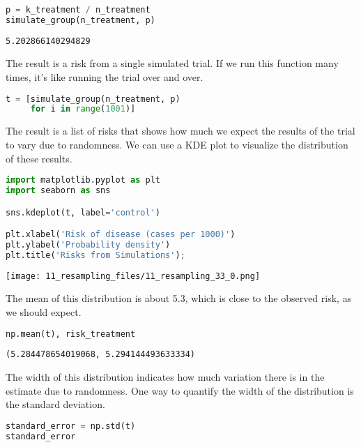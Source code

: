 \begin{lstlisting}[language=Python,style=source]
p = k_treatment / n_treatment
simulate_group(n_treatment, p)
\end{lstlisting}

\begin{lstlisting}[style=output]
5.202866140294829
\end{lstlisting}

The result is a risk from a single simulated trial. If we run this
function many times, it's like running the trial over and over.

\begin{lstlisting}[language=Python,style=source]
t = [simulate_group(n_treatment, p) 
     for i in range(1001)]
\end{lstlisting}

The result is a list of risks that shows how much we expect the results
of the trial to vary due to randomness. We can use a KDE plot to
visualize the distribution of these results.

\begin{lstlisting}[language=Python,style=source]
import matplotlib.pyplot as plt
import seaborn as sns

sns.kdeplot(t, label='control')

plt.xlabel('Risk of disease (cases per 1000)')
plt.ylabel('Probability density')
plt.title('Risks from Simulations');
\end{lstlisting}

\begin{center}
\texttt{[image: 11\_resampling\_files/11\_resampling\_33\_0.png]}
\end{center}

The mean of this distribution is about 5.3, which is close to the
observed risk, as we should expect.

\begin{lstlisting}[language=Python,style=source]
np.mean(t), risk_treatment
\end{lstlisting}

\begin{lstlisting}[style=output]
(5.284478654019068, 5.294144493633334)
\end{lstlisting}

The width of this distribution indicates how much variation there is in
the estimate due to randomness. One way to quantify the width of the
distribution is the standard deviation.

\begin{lstlisting}[language=Python,style=source]
standard_error = np.std(t)
standard_error
\end{lstlisting}

